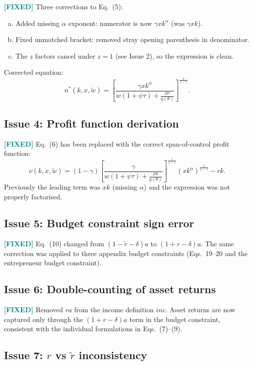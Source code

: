 \documentclass[11pt]{article}
\newcommand{\fixed}{\textcolor{teal}{\textbf{[FIXED]}}}
\begin{document}
\fixed{} Three corrections to Eq.~(5):
\begin{enumerate}[(a)]
    \item Added missing $\alpha$ exponent: numerator is now $\gamma x k^{\alpha}$ (was $\gamma x k$).
    \item Fixed unmatched bracket: removed stray opening parenthesis in denominator.
    \item The $z$ factors cancel under $z=1$ (see Issue 2), so the expression is clean.
\end{enumerate}
Corrected equation:
\[
n^{*}(k,x,\widetilde{w})=\left[\frac{\gamma xk^{\alpha}}{w(1+\psi\tau)+\frac{\rho\kappa}{q(\theta)}}\right]^{\frac{1}{1-\gamma}}.
\]

\subsection*{Issue 4: Profit function derivation}

\fixed{} Eq.~(6) has been replaced with the correct span-of-control profit function:
\[
\nu(k,x,\widetilde{w})=(1-\gamma)\left[\frac{\gamma}{w(1+\psi\tau)+\frac{\rho\kappa}{q(\theta)}}\right]^{\frac{\gamma}{1-\gamma}}\left(xk^{\alpha}\right)^{\frac{1}{1-\gamma}}-rk.
\]
Previously the leading term was $xk$ (missing $\alpha$) and the expression was not properly factorised.

\subsection*{Issue 5: Budget constraint sign error}

\fixed{} Eq.~(10) changed from $(1-\tilde{r}-\delta)a$ to $(1+r-\delta)a$. The same correction was applied to three appendix budget constraints (Eqs.~19--20 and the entrepreneur budget constraint).

\subsection*{Issue 6: Double-counting of asset returns}

\fixed{} Removed $ra$ from the income definition $inc$. Asset returns are now captured only through the $(1+r-\delta)a$ term in the budget constraint, consistent with the individual formulations in Eqs.~(7)--(9).

\subsection*{Issue 7: $r$ vs $\tilde{r}$ inconsistency}
\end{document}
